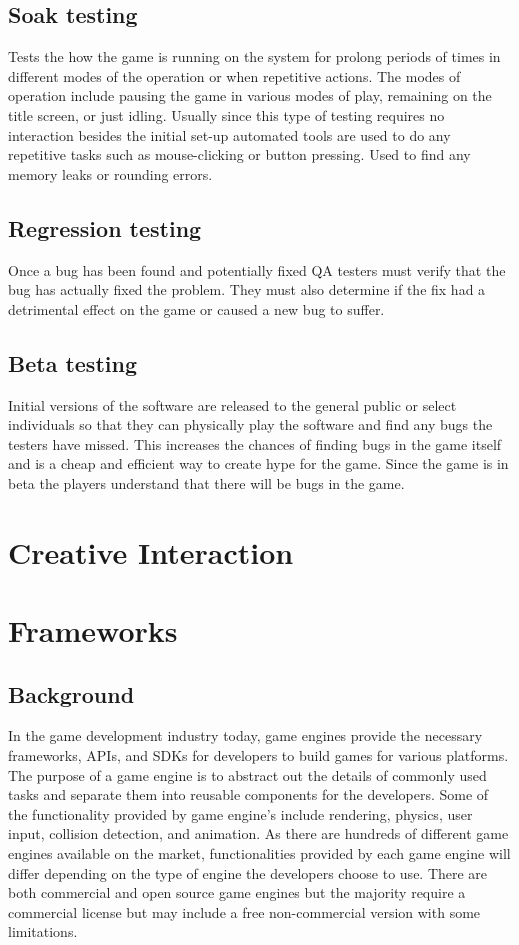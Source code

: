 \subsection{Soak testing} Tests the how the game is running on the system for prolong periods of times in different modes of the operation or when repetitive actions. The modes of operation include pausing the game in various modes of play, remaining on the title screen, or just idling. Usually since this type of testing requires no interaction besides the initial set-up automated tools are used to do any repetitive tasks such as mouse-clicking or button pressing. Used to find any memory leaks or rounding errors.

\subsection{Regression testing} Once a bug has been found and potentially fixed QA testers must verify that the bug has actually fixed the problem. They must also determine if the fix had a detrimental effect on the game or caused a new bug to suffer.

\subsection{Beta testing} Initial versions of the software are released to the general public or select individuals so that they can physically play the software and find any bugs the testers have missed. This increases the chances of finding bugs in the game itself and is a cheap and efficient way to create hype for the game. Since the game is in beta the players understand that there will be bugs in the game.

\section{Creative Interaction}

\section{Frameworks}

\subsection{Background}
In the game development industry today, game engines provide the necessary frameworks, APIs, and SDKs for developers to build games for various platforms. The purpose of a game engine is to abstract out the details of commonly used tasks and separate them into reusable components for the developers. Some of the functionality provided by game engine's include rendering, physics, user input, collision detection, and animation. As there are hundreds of different game engines available on the market, functionalities provided by each game engine will differ depending on the type of engine the developers choose to use. There are both commercial and open source game engines but the majority require a commercial license but may include a free non-commercial version with some limitations.


